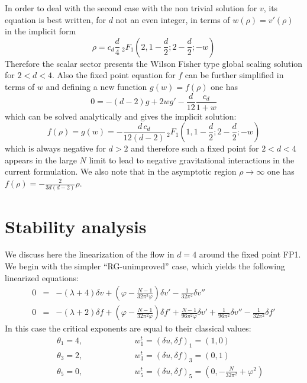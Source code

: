 \documentclass[11pt]{book} %
\newcommand{\be}{\begin{equation}}
\newcommand{\ee}{\end{equation}}
\newcommand{\bea}{\begin{eqnarray}}
\newcommand{\eea}{\end{eqnarray}}
\begin{document}
In order to deal with the  second case with the non trivial solution for $v$, its equation is best written,
for $d$ not an even integer, in terms of $w(\rho)=v'(\rho)$ in the implicit form
\be
\rho=c_d \frac{d}{4}  \ _2F_1\left(2,1-\frac{d}{2};2-\frac{d}{2};-w\right)
\ee
Therefore the scalar sector presents the Wilson Fisher type global scaling solution for $2<d<4$.
Also the fixed point equation for $f$ can be further simplified in terms of $w$ and defining a new function $g(w)=f(\rho)$ one has
\be
0=-(d-2) g+2 w g'-\frac{ d}{12}\frac{c_d} {1+w}
\ee
which can be solved analytically and gives the implicit solution:
\be
f(\rho)=g(w)=-\frac{d \,c_d}{12 (d-2)} \, _2F_1\left(1,1-\frac{d}{2};2-\frac{d}{2};-w\right)
\ee
which is always negative for $d>2$ and therefore such a fixed point for $2<d<4$ appears in the large $N$ limit to lead to negative gravitational interactions in the current formulation.
We also note that in the asymptotic region $\rho\to\infty$ one has $f(\rho)= -\frac{2 }{3 d (d-2) } \rho$.


\section{Stability analysis}

We discuss here the linearization of the flow in $d=4$ around the
fixed point FP1.
We begin with the simpler ``RG-unimproved'' case,
which yields the following linearized equations:
\bea
0&=&
-(\lambda +4)\delta v
+\left(\varphi-\frac{N-1}{32\pi^2\varphi}\right)\delta v'
-\frac{1}{32\pi^2}\delta v''  \\
0&=& -(\lambda +2)\delta f
+\left(\varphi-\frac{N-1}{32\pi^2\varphi}\right)\delta f'
+\frac{N-1}{96\pi^2\varphi}\delta v'
+\frac{1}{96\pi^2}\delta v''
-\frac{1}{32\pi^2}\delta f'
\eea
In this case the critical exponents are equal to their classical values:
\bea
&{}&\theta_1=4 , \qquad \qquad  \qquad \ w_1^t=(\delta u,\delta\! f)_1 = (1,0) \\
&{}&\theta_3=2 , \qquad  \qquad  \qquad \ w_3^t=(\delta u,\delta\! f)_3 = (0,1) \nonumber\\
&{}&\theta_5=0 , \qquad  \qquad \qquad \ w_5^t=(\delta u,\delta\! f)_5
=\left(0, \nonumber-\frac{N}{32\pi^2}+\varphi^2\right)
\eea
\end{document}
